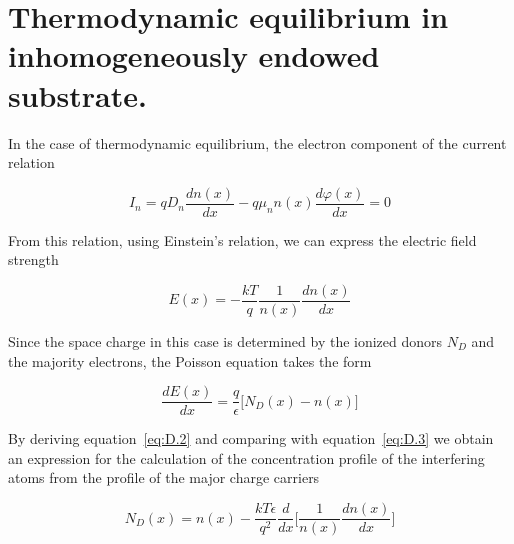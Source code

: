 
\chapter{Thermodynamic equilibrium in inhomogeneously endowed substrate.}\label{app:AppendixD}

In the case of thermodynamic equilibrium, the electron component of
the current relation

\begin{equation}\label{eq:D.1}
  I_n = qD_n\frac{dn(x)}{dx} - q\mu_{n}n(x) \frac{d\varphi(x)}{dx} = 0
\end{equation}

From this relation, using Einstein's relation, we can express the
electric field strength

\begin{equation}\label{eq:D.2}
  E(x) = - \frac{kT}{q} \frac{1}{n(x)} \frac{dn(x)}{dx}
\end{equation}

Since the space charge in this case is determined by the ionized
donors $N_D$ and the majority electrons, the Poisson equation takes
the form

\begin{equation}\label{eq:D.3}
  \frac{dE(x)}{dx} = \frac{q}{\epsilon} \big[N_D(x) - n(x)\big]
\end{equation}

By deriving equation~\ref{eq:D.2} and comparing with
equation~\ref{eq:D.3} we obtain an expression for the calculation of
the concentration profile of the interfering atoms from the profile of
the major charge carriers

\begin{equation}\label{eq:D.4}
  N_D(x) = n(x) - \frac{kT\epsilon}{q^2} \frac{d}{dx} \bigg[\frac{1}{n(x)} \frac{dn(x)}{dx}\bigg]
\end{equation}
